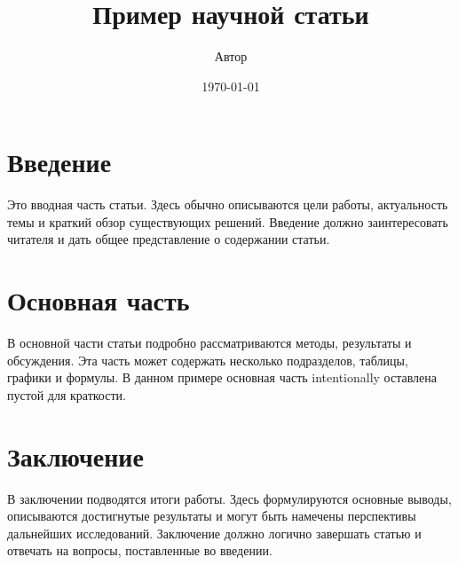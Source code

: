 \documentclass{article}
\title{Пример научной статьи}
\author{Автор}
\date{\today}
\begin{document}
\maketitle

\section{Введение}
Это вводная часть статьи. Здесь обычно описываются цели работы, актуальность темы и краткий обзор существующих решений. Введение должно заинтересовать читателя и дать общее представление о содержании статьи.

\section{Основная часть}
В основной части статьи подробно рассматриваются методы, результаты и обсуждения. Эта часть может содержать несколько подразделов, таблицы, графики и формулы. В данном примере основная часть intentionally оставлена пустой для краткости.

\section{Заключение}
В заключении подводятся итоги работы. Здесь формулируются основные выводы, описываются достигнутые результаты и могут быть намечены перспективы дальнейших исследований. Заключение должно логично завершать статью и отвечать на вопросы, поставленные во введении.
\end{document}
